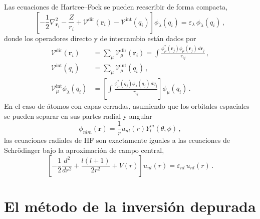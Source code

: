 Las ecuaciones de Hartree--Fock se pueden reescribir de forma compacta, 
\begin{equation}
\left[-\frac{1}{2}\nabla_{\mathbf{r}_i}^2-\frac{Z}{r_i}
+\mathcal{V}^{\mathrm{dir}}(\mathbf{r}_i)
-\mathcal{V}^{\mathrm{int}}(q_i) \right]
\phi_{\lambda}(q_i)=\varepsilon_{\lambda}\,\phi_{\lambda}(q_i)\,,
\label{eq:compactHFeqs}
\end{equation}
donde los operadores directo y de intercambio están dados por
\begin{align}
\mathcal{V}^{\mathrm{dir}}(\mathbf{r}_i) &
=\sum_\mu \mathcal{V}_\mu^{\mathrm{dir}}(\mathbf{r}_i)
=\int\frac{\phi_{\mu}^*(\mathbf{r}_j)\phi_{\mu}(\mathbf{r}_j)\, 
d\mathbf{r}_j}{r_{ij}} \,, \\
\mathcal{V}^{\mathrm{int}}(q_i) 
&=\sum_\mu \mathcal{V}_\mu^{\mathrm{int}}(q_i) \,,\\
\mathcal{V}_\mu^{\mathrm{int}} \phi_{\lambda}(q_i) &= \left[
\int\frac{\phi_{\mu}^*(q_j)\phi_{\lambda}(q_j)\,dq_j}{r_{ij}} \right] 
\phi_\mu(q_i)\,.
\end{align}
En el caso de átomos con capas cerradas, asumiendo que los orbitales 
espaciales se pueden separar en sus partes radial y angular
\begin{equation}
\phi_{nlm}(\mathbf{r})=\frac{1}{r}u_{nl}(r)Y_l^m(\theta,\phi)\,,
\end{equation}
las ecuaciones radiales de HF son exactamente iguales a las ecuaciones 
de Schr\"odinger bajo la aproximación de campo central, 
\begin{equation}
 \left[ -\frac{1}{2}\frac{d^2}{dr^2} + \frac{l(l+1)}{2r^2} +
 V(r) \right] u_{nl}(r) = \varepsilon_{nl} \, u_{nl}(r)\,.
\label{eq:eqSchroRadial}
\end{equation}


\section{El método de la inversión depurada}
\label{sec:dimatomos}

